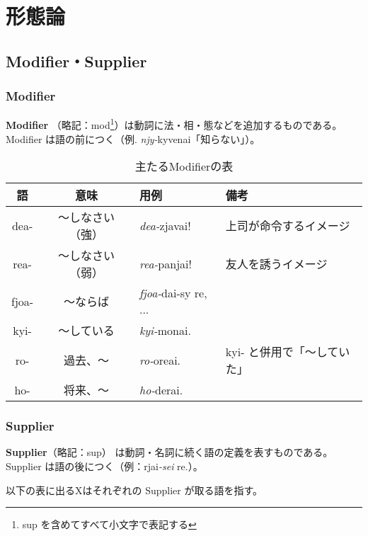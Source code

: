 \section{形態論}

\subsection{Modifier・Supplier}

\subsubsection{Modifier}
\textbf{Modifier} （略記：mod\footnote{sup を含めてすべて小文字で表記する}）は動詞に法・相・態などを追加するものである。
Modifier は語の前につく（例. \emph{njy-}kyvenai「知らない」）。

\begin{table}[h]
    \centering
    \caption{主たるModifierの表}
    \begin{tabular}{ccll}
        \hline
        語 & 意味 & 用例 & 備考 \\
        \hline \hline
        dea-  & ～しなさい（強） & \emph{dea-}zjavai! & 上司が命令するイメージ \\
        rea-  & ～しなさい（弱） & \emph{rea-}panjai! & 友人を誘うイメージ\\
        fjoa- & ～ならば  & \emph{fjoa-}dai-sy re, ...& \\
        kyi-  & ～している & \emph{kyi-}monai. & \\
        ro-   & 過去、～ & \emph{ro-}oreai. & kyi- と併用で「～していた」\\
        ho-   & 将来、～ & \emph{ho-}derai. & \\
        \hline
    \end{tabular}
\end{table}

\subsubsection{Supplier}

\textbf{Supplier}（略記：sup） は動詞・名詞に続く語の定義を表すものである。
Supplier は語の後につく（例：rjai\emph{-sei} re.）。

以下の表に出るXはそれぞれの Supplier が取る語を指す。

